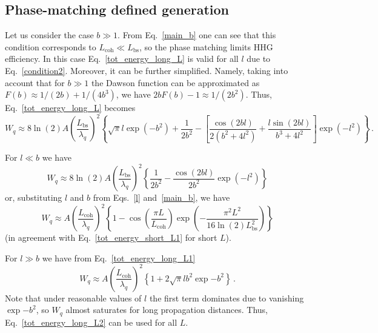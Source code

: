 \subsection{Phase-matching defined generation}
%
Let us consider the case $b \gg 1$. From Eq.~\eqref{main_b} one can see that this condition corresponds to $L_\mathrm{coh} \ll L_\mathrm{bs}$, so the phase matching limits HHG efficiency. In this case Eq.~\eqref{tot_energy_long_L} is valid for all $l$ due to Eq.~\eqref{condition2}. Moreover, it can be further simplified. Namely, taking into account that for $b \gg 1$ the Dawson function can be approximated as $F(b) \approx 1/(2b)+1/(4 b^3)$, we have $2 b F (b) -1 \approx 1/(2 b^2)$. Thus, Eq.~\eqref{tot_energy_long_L} becomes
\begin{equation}
W_q \approx 8 \ln(2) A \left( \frac{L_\mathrm{bs}}{\lambda_q}\right)^2
\left\{ \sqrt{\pi} l \exp(-b^2)+\frac{1}{2b^2} - \left[ \frac{\cos(2 b l)}{2(b^2+4 l^2)}+ \frac{l \sin(2 b l)}{b^3+4 l^2}\right] \exp(-l^2) \right\} \, .
\label{tot_energy_long_L1}
\end{equation}

For $l \ll b$ we have
\begin{equation}
W_q \approx 8 \ln(2) A \left( \frac{L_\mathrm{bs}}{\lambda_q}\right)^2
\left\{ \frac{1}{2b^2} -  \frac{\cos(2 b l)}{2b^2} \exp(-l^2) \right\} 
\label{tot_energy_long_L11}
\end{equation}
or, substituting $l$ and $b$ from Eqs.~\eqref{l} and~\eqref{main_b}, we have
\begin{equation}
W_q \approx A  \left( \frac{L_\mathrm{coh}}{\lambda_q}\right)^2
\left\{ 1 - \cos\left(\frac{\pi L}{L_\mathrm{coh}}\right) \exp\left( - \frac{\pi^2 L^2}{16\ln(2) L_\mathrm{bs}^2}\right) \right\} 
\label{tot_energy_long_L2}
\end{equation}
(in agreement with Eq.~\eqref{tot_energy_short_L1} for short $L$).

For $l \gg b$ we have from Eq.~\eqref{tot_energy_long_L1}
\begin{equation}
W_q \approx  A\left( \frac{L_\mathrm{coh}}{\lambda_q}\right)^2
\left\{ 1 + 2 \sqrt{\pi} l b^2 \exp{-b^2} \right\} \, .
\label{tot_energy_long_L3}
\end{equation}
Note that under reasonable values of $l$ the first term dominates due to vanishing $\exp{-b^2}$, so $W_q$ almost saturates for long propagation distances. Thus, Eq.~\eqref{tot_energy_long_L2} can be used for all $L$.


%
